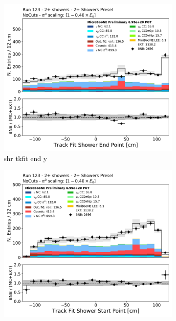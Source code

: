 \begin{figure}[H]
    \centering
    \begin{subfigure}{0.3\textwidth}
    \includegraphics[width=1.0\textwidth]{Sidebands/Figures/TwoShr_1e0pSel/Presel/shr_trk_sce_end_y.pdf}
    \caption{shr tkfit end y}
    \end{subfigure}
    \begin{subfigure}{0.3\textwidth}
    \includegraphics[width=1.0\textwidth]{Sidebands/Figures/TwoShr_1e0pSel/Presel/shr_trk_sce_start_y.pdf}

\end{subfigure}
\end{figure}
